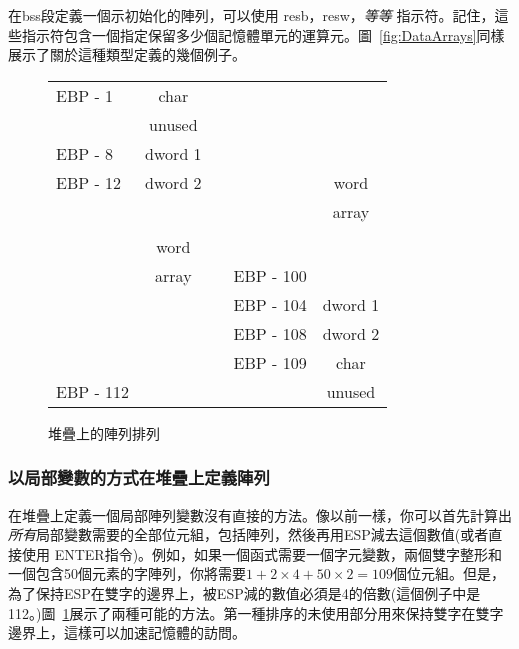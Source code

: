 在{\code bss}段定義一個示初始化的陣列，可以使用
{\code resb}，{\code resw}，\emph{等等} 
指示符。記住，這些指示符包含一個指定保留多少個記憶體單元的運算元。圖~\ref{fig:DataArrays}同樣展示了關於這種類型定義的幾個例子。

\begin{figure}[t]
\centering
\begin{tabular}{l|c|ll|c|}
\cline{2-2} \cline{5-5}
EBP - 1  & char    & \hspace{2em} &           & \\
\cline{2-2}
         & unused  &              &           & \\
\cline{2-2}
EBP - 8  & dword 1 &              &           & \\
\cline{2-2}
EBP - 12 & dword 2 &              &           & word \\
\cline{2-2}
         &         &              &           & array \\
         &         &              &           & \\
         & word    &              &           & \\
         & array   &              & EBP - 100 & \\
\cline{5-5}
         &         &              & EBP - 104 & dword 1 \\
\cline{5-5}
         &         &              & EBP - 108 & dword 2 \\
\cline{5-5}
         &         &              & EBP - 109 & char \\
\cline{5-5}
EBP - 112 &        &              &           & unused \\
\cline{2-2} \cline{5-5}
\end{tabular}
\caption{堆疊上的陣列排列\label{fig:StackLayouts}}
\end{figure}

\subsubsection{以局部變數的方式在堆疊上定義陣列}

在堆疊上定義一個局部陣列變數沒有直接的方法。像以前一樣，你可以首先計算出\emph{所有}局部變數需要的全部位元組，包括陣列，然後再用ESP減去這個數值(或者直接使用{\code
ENTER}指令)。例如，如果一個函式需要一個字元變數，兩個雙字整形和一個包含50個元素的字陣列，你將需要$1
+ 2 \times 4 + 50 \times 2 =
109$個位元組。但是，為了保持ESP在雙字的邊界上，被ESP減的數值必須是4的倍數(這個例子中是112。)圖~\ref{fig:StackLayouts}展示了兩種可能的方法。第一種排序的未使用部分用來保持雙字在雙字邊界上，這樣可以加速記憶體的訪問。

